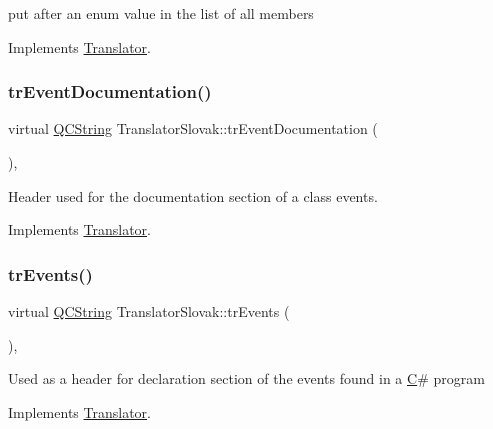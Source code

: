 put after an enum value in the list of all members 

Implements \mbox{\hyperlink{class_translator}{Translator}}.

\mbox{\label{class_translator_slovak_a80d1c8a7588136af82900473f1cc769d}} 
\subsubsection{\texorpdfstring{trEventDocumentation()}{trEventDocumentation()}}
{\footnotesize\ttfamily virtual \mbox{\hyperlink{class_q_c_string}{Q\+C\+String}} Translator\+Slovak\+::tr\+Event\+Documentation (\begin{DoxyParamCaption}{ }\end{DoxyParamCaption})\hspace{0.3cm}{\ttfamily [inline]}, {\ttfamily [virtual]}}

Header used for the documentation section of a class\textquotesingle{} events. 

Implements \mbox{\hyperlink{class_translator}{Translator}}.

\mbox{\label{class_translator_slovak_aef34c61565248c43fe766e85ed657af7}} 
\subsubsection{\texorpdfstring{trEvents()}{trEvents()}}
{\footnotesize\ttfamily virtual \mbox{\hyperlink{class_q_c_string}{Q\+C\+String}} Translator\+Slovak\+::tr\+Events (\begin{DoxyParamCaption}{ }\end{DoxyParamCaption})\hspace{0.3cm}{\ttfamily [inline]}, {\ttfamily [virtual]}}

Used as a header for declaration section of the events found in a \mbox{\hyperlink{class_c}{C}}\# program 

Implements \mbox{\hyperlink{class_translator}{Translator}}.

\mbox{\label{class_translator_slovak_a8797066b2304a1d82ded14545bec80b7}} 
